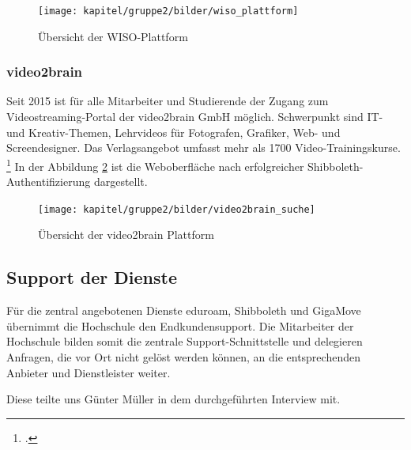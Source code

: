 \begin{figure}[h]
	\centering
	\texttt{[image: kapitel/gruppe2/bilder/wiso\_plattform]}
	\caption{Übersicht der WISO-Plattform \protect\footnotemark}
	\label{fig_wiso_plattform}
\end{figure}
\newpage
\subsubsection{video2brain}
Seit 2015 ist für alle Mitarbeiter und Studierende der Zugang zum Videostreaming-Portal der video2brain GmbH möglich. Schwerpunkt sind IT- und Kreativ-Themen, Lehrvideos für Fotografen, Grafiker, Web- und Screendesigner. Das Verlagsangebot umfasst mehr als 1700 Video-Trainingskurse. \footcite{adsgmbh_video2brain_2013} In der Abbildung \ref{fig_video2brain_suchergebnis} ist die Weboberfläche nach erfolgreicher Shibboleth-Authentifizierung dargestellt.

\begin{figure}[h]
	\centering
	\texttt{[image: kapitel/gruppe2/bilder/video2brain\_suche]}
	\caption{Übersicht der video2brain Plattform \protect\footnotemark}
	\label{fig_video2brain_suchergebnis}
\end{figure}

\subsection{Support der Dienste}
Für die zentral angebotenen Dienste eduroam, Shibboleth und GigaMove übernimmt die Hochschule den Endkundensupport. Die Mitarbeiter der Hochschule bilden somit die zentrale Support-Schnittstelle und delegieren Anfragen, die vor Ort nicht gelöst werden können, an die entsprechenden Anbieter und Dienstleister weiter.

Diese teilte uns Günter Müller in dem durchgeführten Interview mit.